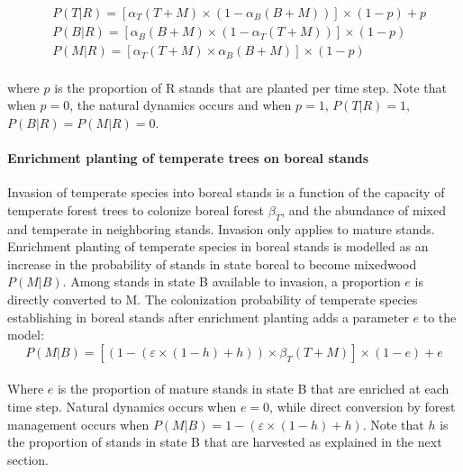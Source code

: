 \begin{equation}
\begin{split}
&P(T|R) = [\alpha_T (T+M) \times (1-\alpha_B (B+M))] \times (1 - p) +  p \\[2pt]
&P(B|R) = [\alpha_B (B+M) \times (1-\alpha_T (T+M))] \times (1 - p) \\[2pt]
&P(M|R) = [\alpha_T (T+M) \times \alpha_B (B+M)] \times (1 - p)
\end{split}
\label{eq:plantation}\end{equation}\\

where \(p\) is the proportion of R stands that are planted per time
step. Note that when \(p=0\), the natural dynamics occurs and when
\(p=1\), \(P(T|R)=1\), \(P(B|R)=P(M|R)=0\).\\

\hypertarget{enrichment-planting-of-temperate-trees-on-boreal-stands}{%
\paragraph{Enrichment planting of temperate trees on boreal
stands}\label{enrichment-planting-of-temperate-trees-on-boreal-stands}}

Invasion of temperate species into boreal stands is a function of the
capacity of temperate forest trees to colonize boreal forest
\(\beta_T\), and the abundance of mixed and temperate in neighboring
stands. Invasion only applies to mature stands. Enrichment planting of
temperate species in boreal stands is modelled as an increase in the
probability of stands in state boreal to become mixedwood \(P(M|B)\).
Among stands in state B available to invasion, a proportion \(e\) is
directly converted to M. The colonization probability of temperate
species establishing in boreal stands after enrichment planting adds a
parameter \(e\) to the model:\\

\begin{equation}
P(M|B) = [(1- (\varepsilon \times (1 - h) + h)) \times \beta_T(T + M)] \times (1-e) + e
\label{eq:enrichplanting}\end{equation}\\

Where \(e\) is the proportion of mature stands in state B that are
enriched at each time step. Natural dynamics occurs when \(e=0\), while
direct conversion by forest management occurs when
\(P(M|B)= 1- (\varepsilon \times (1 - h) + h)\). Note that \(h\) is the
proportion of stands in state B that are harvested as explained in the
next section.\\

